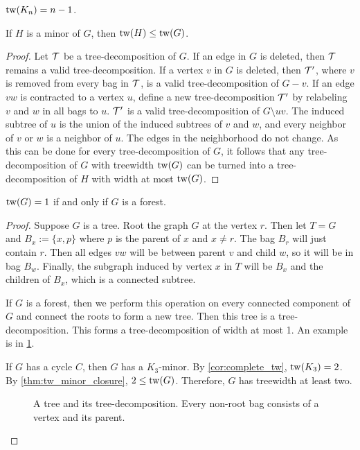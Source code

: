 \begin{corollary}\label{cor:complete_tw}
	\(\operatorname{tw}(K_n) = n-1\).
\end{corollary}

\begin{theorem}\label{thm:tw_minor_closure}
	If \(H\) is a minor of \(G\), then \(\operatorname{tw}(H) \leq \operatorname{tw}(G)\).
\end{theorem}
\begin{proof}
	Let \(\mathcal{T}\) be a tree-decomposition of \(G\). If an edge in \(G\) is deleted, then \(\mathcal{T}\) remains a valid tree-decomposition. If a vertex $v$ in $G$ is deleted, then \(\mathcal{T}'\), where \(v\) is removed from every bag in \(\mathcal{T}\), is a valid tree-decomposition of $G - v$. If an edge \(vw\) is contracted to a vertex $u$, define a new tree-decomposition $\mathcal{T}'$ by  relabeling \(v\) and \(w\) in all bags to \(u\). $\mathcal{T}'$ is a valid tree-decomposition of $G \setminus uv$. The induced subtree of \(u\) is the union of the induced subtrees of \(v\) and \(w\), and every neighbor of \(v\) or \(w\) is a neighbor of \(u\). The edges in the neighborhood do not change. As this can be done for every tree-decomposition of $G$, it follows that any tree-decomposition of $G$ with treewidth $\operatorname{tw}(G)$ can be turned into a tree-decomposition of $H$ with width at most $\operatorname{tw}(G)$. 
\end{proof}

\begin{lemma}\label{lem:treewidth_forest}
	\(\operatorname{tw}(G) = 1\) if and only if \(G\) is a forest.
\end{lemma}

\begin{proof}
	Suppose \(G\) is a tree. Root the graph \(G\) at the vertex \(r\). Then let \(T = G\) and \(B_x:= \lbrace x, p \rbrace\) where \(p\) is the parent of \(x\) and $x \neq r$. The bag \(B_r\) will just contain \(r\). Then all edges \(vw\) will be between parent \(v\) and child \(w\), so it will be in bag \(B_w\). Finally, the subgraph induced by vertex \(x\) in \(T\) will be \(B_x\) and the children of \(B_x\), which is a connected subtree.
	\par
	If \(G\) is a forest, then we perform this operation on every connected component of \(G\) and connect the roots to form a new tree. Then this tree is a tree-decomposition. This forms a tree-decomposition of width at most 1. An example is in \cref{fig:tree-treedecomp}.
	\par
	If \(G\) has a cycle \(C\), then $G$ has a $K_3$-minor. By \cref{cor:complete_tw}, $\operatorname{tw}(K_3) = 2$. By \cref{thm:tw_minor_closure}, $2 \leq \operatorname{tw}(G)$. Therefore, $G$ has treewidth at least two. 
	\begin{figure}[ht]
		\centering
		
		
		\caption{A tree and its tree-decomposition. Every non-root bag consists of a vertex and its parent.}\label{fig:tree-treedecomp}
	\end{figure}
\end{proof}

